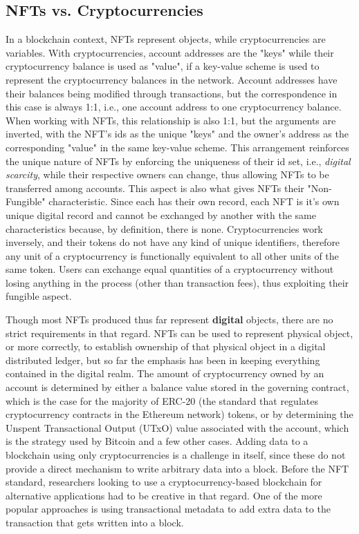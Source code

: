 \documentclass[../main.tex]{subfiles}
\begin{document}
\subsection{NFTs vs. Cryptocurrencies}
In a blockchain context, NFTs represent objects, while cryptocurrencies are variables. With cryptocurrencies, account addresses are the "keys" while their cryptocurrency balance is used as "value", if a key-value scheme is used to represent the cryptocurrency balances in the network. Account addresses have their balances being modified through transactions, but the correspondence in this case is always 1:1, i.e., one account address to one cryptocurrency balance. When working with NFTs, this relationship is also 1:1, but the arguments are inverted, with the NFT's ids as the unique "keys" and the owner's address as the corresponding "value" in the same key-value scheme. This arrangement reinforces the unique nature of NFTs by enforcing the uniqueness of their id set, i.e., \textit{digital scarcity}, while their respective owners can change, thus allowing NFTs to be transferred among accounts. This aspect is also what gives NFTs their "Non-Fungible" characteristic. Since each has their own record, each NFT is it's own unique digital record and cannot be exchanged by another with the same characteristics because, by definition, there is none. Cryptocurrencies work inversely, and their tokens do not have any kind of unique identifiers, therefore any unit of a cryptocurrency is functionally equivalent to all other units of the same token. Users can exchange equal quantities of a cryptocurrency without losing anything in the process (other than transaction fees), thus exploiting their fungible aspect.
\par
Though most NFTs produced thus far represent \textbf{digital} objects, there are no strict requirements in that regard. NFTs can be used to represent physical object, or more correctly, to establish ownership of that physical object in a digital distributed ledger, but so far the emphasis has been in keeping everything contained in the digital realm. The amount of cryptocurrency owned by an account is determined by either a balance value stored in the governing contract, which is the case for the majority of ERC-20 (the standard that regulates cryptocurrency contracts in the Ethereum network) tokens, or by determining the Unspent Transactional Output (UTxO) value associated with the account, which is the strategy used by Bitcoin and a few other cases. Adding data to a blockchain using only cryptocurrencies is a challenge in itself, since these do not provide a direct mechanism to write arbitrary data into a block. Before the NFT standard, researchers looking to use a cryptocurrency-based blockchain for alternative applications had to be creative in that regard. One of the more popular approaches is using transactional metadata to add extra data to the transaction that gets written into a block.
\end{document}

